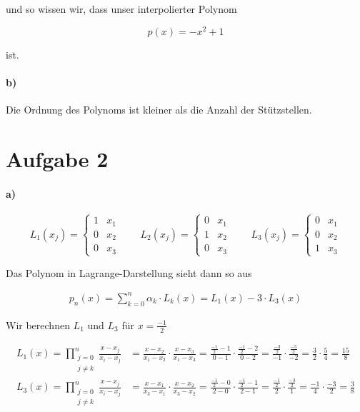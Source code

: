 \documentclass[a4paper,ngerman]{scrartcl}
\begin{document}
und so wissen wir, dass unser interpolierter Polynom

\[
p(x) = -x^2 + 1
\]

ist.

\paragraph{b)}
Die Ordnung des Polynoms ist kleiner als die Anzahl der Stützstellen.


\section*{Aufgabe 2}

\paragraph{a)}
\[
  L_1(x_j) =
  \begin{cases}
    1 & x_1\\
    0 & x_2\\
    0 & x_3
  \end{cases} \qquad
  L_2(x_j) =
  \begin{cases}
    0 & x_1\\
    1 & x_2\\
    0 & x_3
  \end{cases} \qquad
  L_3(x_j) =
  \begin{cases}
    0 & x_1\\
    0 & x_2\\
    1 & x_3
  \end{cases}
\]

Das Polynom in Lagrange-Darstellung sieht dann so aus

\begin{align*}
  p_n(x) = \sum^n_{k=0} \alpha_k\cdot L_k(x) = L_1(x) -3\cdot L_3(x)
\end{align*}

Wir berechnen $L_1$ und $L_3$ für $x=\frac{-1}{2}$

\begin{align*}
  L_1(x) = \prod^n_{\substack{j = 0\\j \neq k}} \frac{x - x_j}{x_i -
    x_j} &= \frac{x - x_2}{x_1 - x_2} \cdot \frac{x - x_3}{x_1 - x_3}
  = \frac{\frac{-1}{2} - 1}{0 -1}\cdot \frac{\frac{-1}{2} - 2}{0 -2}
  = \frac{\frac{-3}{2}}{-1} \cdot \frac{\frac{-5}{2}}{-2} =
  \frac{3}{2} \cdot \frac{5}{4} = \frac{15}{8}\\
  L_3(x) = \prod^n_{\substack{j = 0\\j \neq k}} \frac{x - x_j}{x_i -
    x_j} &= \frac{x - x_1}{x_3 - x_1} \cdot \frac{x - x_2}{x_3 - x_2}
  = \frac{\frac{-1}{2} - 0}{2 - 0}\cdot \frac{\frac{-1}{2} - 1}{2 - 1}
  = \frac{\frac{-1}{2}}{2} \cdot \frac{\frac{-3}{2}}{1} =
  \frac{-1}{4} \cdot \frac{-3}{2} = \frac{3}{8}
\end{align*}
\end{document}
